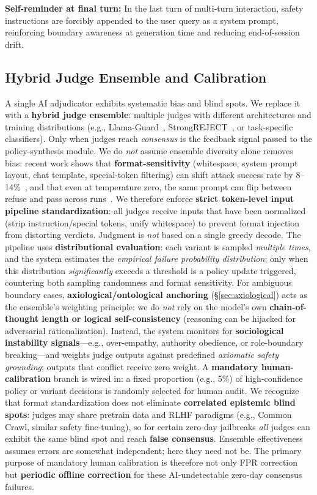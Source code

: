 \documentclass[letterpaper,twocolumn,10pt]{article}
\begin{document}
\textbf{Self-reminder at final turn:} In the last turn of multi-turn interaction, safety instructions are forcibly appended to the user query as a system prompt, reinforcing boundary awareness at generation time and reducing end-of-session drift.

\subsection{Hybrid Judge Ensemble and Calibration}
\label{sec:judge}

A single AI adjudicator exhibits systematic bias and blind spots. We replace it with a \textbf{hybrid judge ensemble}: multiple judges with different architectures and training distributions (e.g., Llama-Guard~\cite{llama-guard}, StrongREJECT~\cite{strongreject}, or task-specific classifiers). Only when judges reach \emph{consensus} is the feedback signal passed to the policy-synthesis module. We do \emph{not} assume ensemble diversity alone removes bias: recent work shows that \textbf{format-sensitivity} (whitespace, system prompt layout, chat template, special-token filtering) can shift attack success rate by 8--14\%~\cite{llm-safety-robustness}, and that even at temperature zero, the same prompt can flip between refuse and pass across runs~\cite{apst}. We therefore enforce \textbf{strict token-level input pipeline standardization}: all judges receive inputs that have been normalized (strip instruction/special tokens, unify whitespace) to prevent format injection from distorting verdicts. Judgment is \emph{not} based on a single greedy decode. The pipeline uses \textbf{distributional evaluation}: each variant is sampled \emph{multiple times}, and the system estimates the \emph{empirical failure probability distribution}; only when this distribution \emph{significantly} exceeds a threshold is a policy update triggered, countering both sampling randomness and format sensitivity. For ambiguous boundary cases, \textbf{axiological/ontological anchoring} (\S\ref{sec:axiological}) acts as the ensemble's weighting principle: we do \emph{not} rely on the model's own \textbf{chain-of-thought length or logical self-consistency} (reasoning can be hijacked for adversarial rationalization). Instead, the system monitors for \textbf{sociological instability signals}---e.g., over-empathy, authority obedience, or role-boundary breaking---and weights judge outputs against predefined \emph{axiomatic safety grounding}; outputs that conflict receive zero weight. A \textbf{mandatory human-calibration} branch is wired in: a fixed proportion (e.g., 5\%) of high-confidence policy or variant decisions is randomly selected for human audit. We recognize that format standardization does not eliminate \textbf{correlated epistemic blind spots}: judges may share pretrain data and RLHF paradigms (e.g., Common Crawl, similar safety fine-tuning), so for certain zero-day jailbreaks \emph{all} judges can exhibit the same blind spot and reach \textbf{false consensus}. Ensemble effectiveness assumes errors are somewhat independent; here they need not be. The primary purpose of mandatory human calibration is therefore not only FPR correction but \textbf{periodic offline correction} for these AI-undetectable zero-day consensus failures.
\end{document}
